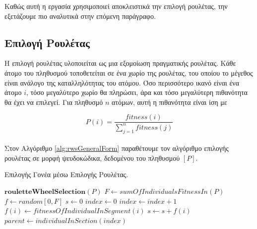 Καθώς αυτή η εργασία χρησιμοποιεί αποκλειστικά την επιλογή ρουλέτας, την εξετάζουμε πιο αναλυτικά στην επόμενη παράγραφο.

\subsection{Επιλογή Ρουλέτας}
\label{subsec:rouletteWheelSelection}
Η επιλογή ρουλέτας υλοποιείται ως μια εξομοίωση πραγματικής ρουλέτας. Κάθε άτομο του πληθυσμού τοποθετείται σε ένα χωρίο της ρουλέτας, του οποίου το μέγεθος είναι ανάλογο της καταλληλότητας του ατόμου. Όσο περισσότερο ικανό είναι ένα άτομο $i$, τόσο μεγαλύτερο χωρίο θα πληρώσει, άρα και τόσο μεγαλύτερη πιθανότητα θα έχει να επιλεγεί. Για πληθυσμό $n$ ατόμων, αυτή η πιθανότητα είναι ίση με 

\begin{equation}
\label{eq:rouletteWheelSelectionWithoutNumerosity}
P(i) = \frac{fitness(i)}{\sum\limits_{j=1}^n fitness(j)}
\end{equation}
\\



Στον Αλγόριθμο \ref{alg:rwsGeneralForm} παραθέτουμε τον αλγόριθμο επιλογής ρουλέτας σε μορφή ψευδοκώδικα, δεδομένου του πληθυσμού $[P]$.
\\

\begin{algorithm}
\caption{Επιλογής Γονέα μέσω Επιλογής Ρουλέτας.}
\label{alg:rwsGeneralForm}
\begin{algorithmic}[1]
\STATE $\textbf{rouletteWheelSelection}(P)$
\STATE $F \gets sumOfIndividualsFitnessIn(P)$
\STATE $f \gets random[0,F]$
\STATE $s \gets 0$
\STATE $index \gets 0$
	\STATE $index \gets index + 1$
	\STATE $f(i) \gets fitnessOfIndividualInSegment(i)$
	\STATE $s \gets s +f(i)$
\ENDWHILE
\STATE $parent \gets individualInSection(index)$
\end{algorithmic}
\end{algorithm}


